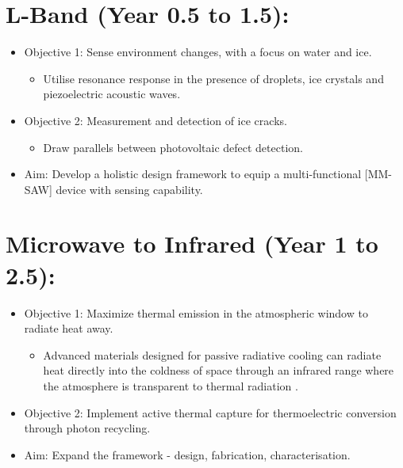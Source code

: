 

\section*{L-Band (Year 0.5 to 1.5):}
\begin{itemize}
    \item Objective 1: Sense environment changes, with a focus on water and ice.
    \begin{itemize}
        \item Utilise resonance response in the presence of droplets, ice crystals and piezoelectric acoustic waves.
    \end{itemize}
    \item Objective 2: Measurement and detection of ice cracks.
    \begin{itemize}
        \item Draw parallels between photovoltaic defect detection.
    \end{itemize}
    \item Aim: Develop a holistic design framework to equip a multi-functional [MM-SAW] device with sensing capability.
\end{itemize}

\section*{Microwave to Infrared (Year 1 to 2.5):}
\begin{itemize}
    \item Objective 1:
     Maximize thermal emission in the atmospheric window to radiate heat away.
    \begin{itemize}
    \item Advanced materials designed for passive radiative cooling can radiate heat directly into the coldness of space through an infrared range where the atmosphere is transparent to thermal radiation \cite{Rephaeli2014RadiativeCooling}.
    \end{itemize}
    \item Objective 2: Implement active thermal capture for thermoelectric conversion through photon recycling.
    \item Aim: Expand the framework - design, fabrication, characterisation.
\end{itemize}

